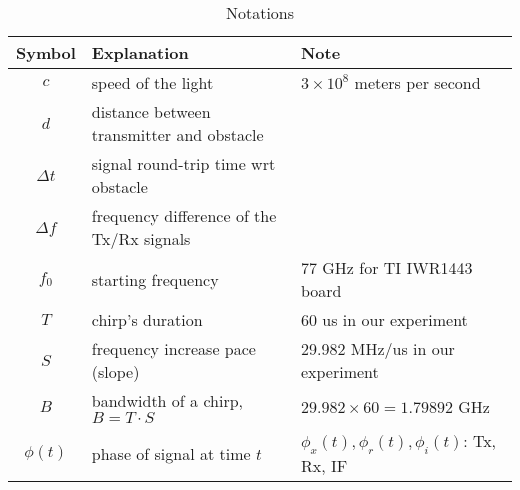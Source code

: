 \documentclass[11pt, oneside]{article}   	%
\begin{document}
\begin{table}[t]
\centering
\caption{Notations}
\label{tab:notation}
\vspace{4pt}
\begin{tabular}{c|l|l}
\hline
\textbf{Symbol} & \textbf{Explanation} & \textbf{\centering Note} \\
\hline
\hline
$c$ & speed of the light & $3\times 10^8$ meters per second\\
\hline
$d$ & distance between transmitter and obstacle & \\
\hline
$\Delta t$ &signal round-trip time wrt obstacle & \\
\hline
$\Delta f$ & frequency difference of the Tx/Rx signals & \\
\hline
$f_0$ & starting frequency & 77 GHz for TI IWR1443 board \\
\hline
$T$ & chirp's duration & 60 us in our experiment \\
\hline
$S$ & frequency increase pace (slope) & 29.982 MHz/us in our experiment\\
\hline
$B$ & bandwidth of a chirp, $B=T\cdot S$ & $29.982 \times 60 = 1.79892$ GHz \\
\hline
$\phi(t)$ & phase of signal at time $t$ & $\phi_x(t), \phi_r(t), \phi_i(t)$: Tx, Rx, IF\\
\hline
\end{tabular}
\end{table}
\end{document}
